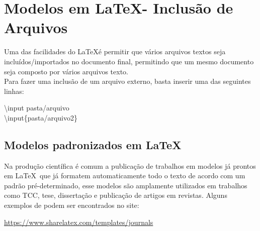 \section{Modelos em \LaTeX - Inclusão de Arquivos}

\begin{frame}
    Uma das facilidades do \LaTeX é  permitir que vários arquivos textos seja incluídos/importados no documento final, permitindo que um mesmo documento seja composto por vários arquivos texto.\\
    Para fazer uma inclusão de um arquivo externo, basta inserir uma das seguintes linhas:

\vspace{1cm}
\begin{center}
    {\code \textbackslash input {pasta/arquivo}}\\
    {\code \textbackslash input\{pasta/arquivo2\}}
\end{center}

\end{frame}


\begin{frame}
\subsection*{Modelos padronizados em \LaTeX} %

Na produção científica é comum a publicação de trabalhos em modelos já  prontos em \LaTeX~que já formatem automaticamente todo o texto de acordo com um padrão pré-determinado, esse modelos são amplamente utilizados em trabalhos como TCC, tese, dissertação e publicação de artigos em revistas. Alguns exemplos de podem ser encontrados no site:

\begin{center}
\url{https://www.sharelatex.com/templates/journals}
\end{center}
\end{frame}


